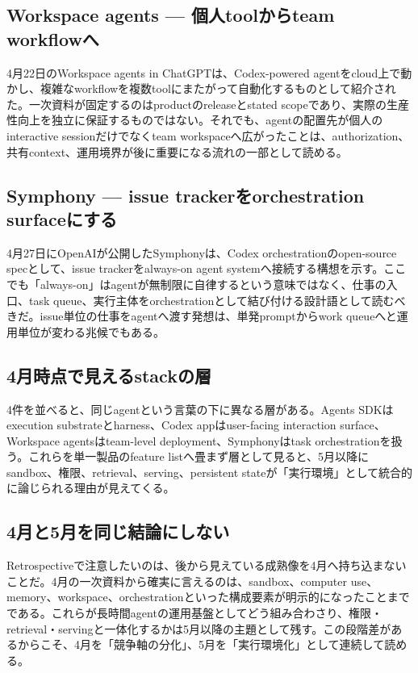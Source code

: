 \begingroup\raggedright
\subsection{Workspace agents — 個人toolからteam workflowへ}
\par\endgroup

4月22日のWorkspace agents in ChatGPTは、Codex-powered agentをcloud上で動かし、複雑なworkflowを複数toolにまたがって自動化するものとして紹介された。一次資料が固定するのはproductのreleaseとstated scopeであり、実際の生産性向上を独立に保証するものではない。それでも、agentの配置先が個人のinteractive sessionだけでなくteam workspaceへ広がったことは、authorization、共有context、運用境界が後に重要になる流れの一部として読める。\autocite{src-c71ef79e3212}


\begingroup\raggedright
\subsection{Symphony — issue trackerをorchestration surfaceにする}
\par\endgroup

4月27日にOpenAIが公開したSymphonyは、Codex orchestrationのopen-source specとして、issue trackerをalways-on agent systemへ接続する構想を示す。ここでも「always-on」はagentが無制限に自律するという意味ではなく、仕事の入口、task queue、実行主体をorchestrationとして結び付ける設計語として読むべきだ。issue単位の仕事をagentへ渡す発想は、単発promptからwork queueへと運用単位が変わる兆候でもある。\autocite{src-f9ff221789e0}


\begingroup\raggedright
\subsection{4月時点で見えるstackの層}
\par\endgroup

4件を並べると、同じagentという言葉の下に異なる層がある。Agents SDKはexecution substrateとharness、Codex appはuser-facing interaction surface、Workspace agentsはteam-level deployment、Symphonyはtask orchestrationを扱う。これらを単一製品のfeature listへ畳まず層として見ると、5月以降にsandbox、権限、retrieval、serving、persistent stateが「実行環境」として統合的に論じられる理由が見えてくる。\autocite{src-1ecdad90bfb4,src-20e34cbfb714,src-c71ef79e3212,src-f9ff221789e0}


\begingroup\raggedright
\subsection{4月と5月を同じ結論にしない}
\par\endgroup

Retrospectiveで注意したいのは、後から見えている成熟像を4月へ持ち込まないことだ。4月の一次資料から確実に言えるのは、sandbox、computer use、memory、workspace、orchestrationといった構成要素が明示的になったことまでである。これらが長時間agentの運用基盤としてどう組み合わさり、権限・retrieval・servingと一体化するかは5月以降の主題として残す。この段階差があるからこそ、4月を「競争軸の分化」、5月を「実行環境化」として連続して読める。\autocite{src-1ecdad90bfb4,src-20e34cbfb714,src-c71ef79e3212,src-f9ff221789e0}


